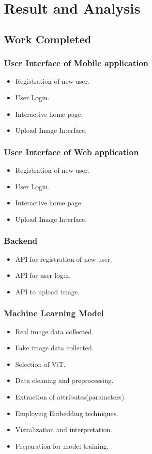 \section{Result and Analysis}
\subsection{Work Completed}
\subsubsection{User Interface of Mobile application}
\begin{itemize}
    \item Registration of new user.
    \item User Login.
    \item Interactive home page.
    \item Upload Image Interface.
\end{itemize}
\subsubsection{User Interface of Web application}
\begin{itemize}
    \item Registration of new user.
    \item User Login.
    \item Interactive home page.
    \item Upload Image Interface.
\end{itemize}
\subsubsection{Backend}
\begin{itemize}
    \item API for registration of new user.
    \item API for user login.
    \item API to upload image.
\end{itemize}
\subsubsection{Machine Learning Model}
\begin{itemize}
    \item Real image data collected.
    \item Fake image data collected.
    \item Selection of ViT.
    \item Data cleaning and preprocessing.
    \item Extraction of attributes(parameters).
    \item Employing Embedding techniques.
    \item Visualization and interpretation.
    \item Preparation for model training.
\end{itemize}

